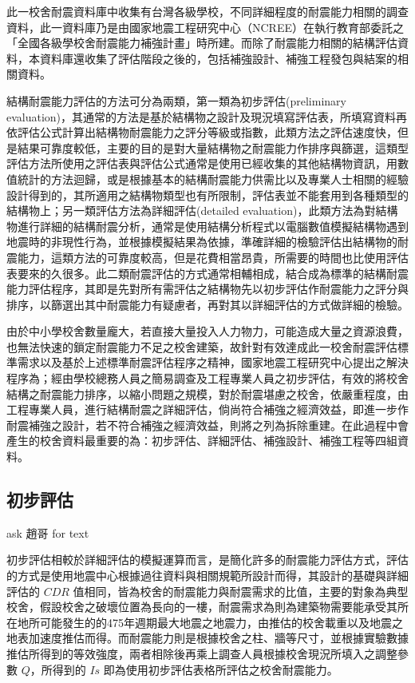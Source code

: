 此一校舍耐震資料庫中收集有台灣各級學校，不同詳細程度的耐震能力相關的調查資料，此一資料庫乃是由國家地震工程研究中心（NCREE）在執行教育部委託之「全國各級學校舍耐震能力補強計畫」時所建。而除了耐震能力相關的結構評估資料，本資料庫還收集了評估階段之後的，包括補強設計、補強工程發包與結案的相關資料。

結構耐震能力評估的方法可分為兩類，第一類為初步評估(preliminary evaluation)，其通常的方法是基於結構物之設計及現況填寫評估表，所填寫資料再依評估公式計算出結構物耐震能力之評分等級或指數，此類方法之評估速度快，但是結果可靠度較低，主要的目的是對大量結構物之耐震能力作排序與篩選，這類型評估方法所使用之評估表與評估公式通常是使用已經收集的其他結構物資訊，用數值統計的方法迴歸，或是根據基本的結構耐震能力供需比以及專業人士相關的經驗設計得到的，其所適用之結構物類型也有所限制，評估表並不能套用到各種類型的結構物上；另一類評估方法為詳細評估(detailed evaluation)，此類方法為對結構物進行詳細的結構耐震分析，通常是使用結構分析程式以電腦數值模擬結構物遇到地震時的非現性行為，並根據模擬結果為依據，準確詳細的檢驗評估出結構物的耐震能力，這類方法的可靠度較高，但是花費相當昂貴，所需要的時間也比使用評估表要來的久很多。此二類耐震評估的方式通常相輔相成，結合成為標準的結構耐震能力評估程序，其即是先對所有需評估之結構物先以初步評估作耐震能力之評分與排序，以篩選出其中耐震能力有疑慮者，再對其以詳細評估的方式做詳細的檢驗。

由於中小學校舍數量龐大，若直接大量投入人力物力，可能造成大量之資源浪費，也無法快速的鎖定耐震能力不足之校舍建築，故針對有效達成此一校舍耐震評估標準需求以及基於上述標準耐震評估程序之精神，國家地震工程研究中心提出之解決程序為；經由學校總務人員之簡易調查及工程專業人員之初步評估，有效的將校舍結構之耐震能力排序，以縮小問題之規模，對於耐震堪慮之校舍，依嚴重程度，由工程專業人員，進行結構耐震之詳細評估，倘尚符合補強之經濟效益，即進一步作耐震補強之設計，若不符合補強之經濟效益，則將之列為拆除重建。在此過程中會產生的校舍資料最重要的為：初步評估、詳細評估、補強設計、補強工程等四組資料。

\subsection{初步評估}

ask 趙哥 for text

初步評估相較於詳細評估的模擬運算而言，是簡化許多的耐震能力評估方式，評估的方式是使用地震中心根據過往資料與相關規範所設計而得，其設計的基礎與詳細評估的 $CDR$ 值相同，皆為校舍的耐震能力與耐震需求的比值，主要的對象為典型校舍，假設校舍之破壞位置為長向的一樓，耐震需求為則為建築物需要能承受其所在地所可能發生的的475年週期最大地震之地震力，由推估的校舍載重以及地震之地表加速度推估而得。而耐震能力則是根據校舍之柱、牆等尺寸，並根據實驗數據推估所得到的等效強度，兩者相除後再乘上調查人員根據校舍現況所填入之調整參數 $Q$，所得到的 $Is$ 即為使用初步評估表格所評估之校舍耐震能力。

